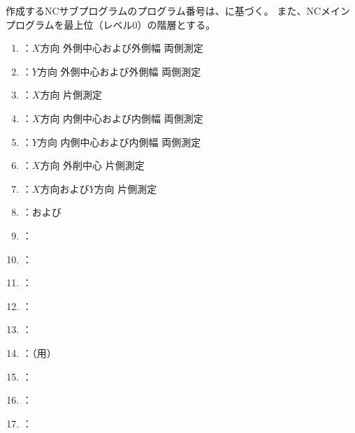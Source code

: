 

作成するNCサブプログラムのプログラム番号は、に基づく。
また、NCメインプログラムを最上位（レベル0）の階層とする。



\begin{enumerate}[label*=\sarrow]
\item \MXOThickness：$X$方向 外側中心および外側幅 両側測定
\item \MYOThickness：$Y$方向 外側中心および外側幅 両側測定
\item \MXOface：$X$方向 \KeywayCenter{} 片側測定
\item \MXIWidth：$X$方向 内側中心および内側幅 両側測定
\item \MYIWidth：$Y$方向 内側中心および内側幅 両側測定
\item \MXIface：$X$方向 外削中心 片側測定
\item \MCenterline：$X$方向および$Y$方向 \CenterlineEndFaceDif 片側測定
\item \DLone：\DimpleMeasurement および\DimpleMilling
\item \KEndFaceRight：\EndFacecutMilling
\item \KOutcutRLeft：\OutcutMilling
\item \KCurvedOutcutRLeft：\CurvedOutcutMilling
\item \KKeywayConerLeft：\KeywayMilling
\item \KEndFaceOutCChamferRLeft：\EndFaceOutCChamferMilling
\item \KEndFaceCurvedOutCChamferRLeft：\EndFaceOutCChamferMilling（\CurvedOutcut 用）
\item \KEndFaceInCChamferRLeft：\EndFaceInCChamferMilling
\item \KEndFaceBoring：\EndFaceBoringMilling
\item \KIncutBoring：\IncutBoringMilling
\end{enumerate}



\clearpage




\subsection{\TBW}
